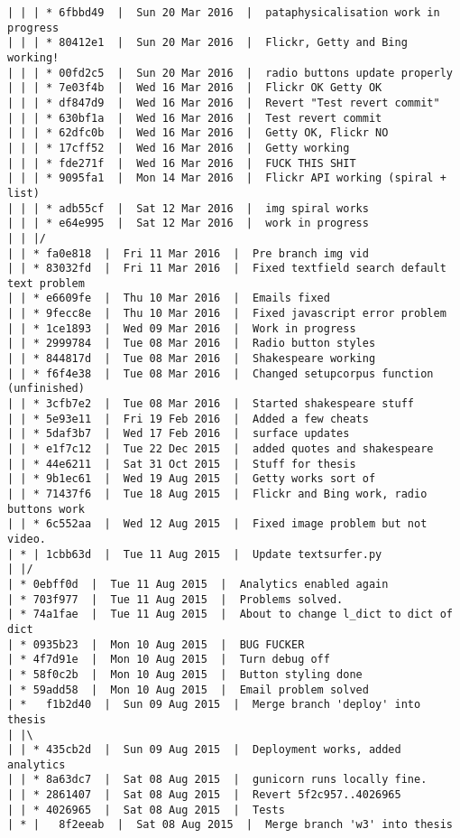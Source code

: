 \begin{verbatim}
| | | * 6fbbd49  |  Sun 20 Mar 2016  |  pataphysicalisation work in progress
| | | * 80412e1  |  Sun 20 Mar 2016  |  Flickr, Getty and Bing working!
| | | * 00fd2c5  |  Sun 20 Mar 2016  |  radio buttons update properly
| | | * 7e03f4b  |  Wed 16 Mar 2016  |  Flickr OK Getty OK
| | | * df847d9  |  Wed 16 Mar 2016  |  Revert "Test revert commit"
| | | * 630bf1a  |  Wed 16 Mar 2016  |  Test revert commit
| | | * 62dfc0b  |  Wed 16 Mar 2016  |  Getty OK, Flickr NO
| | | * 17cff52  |  Wed 16 Mar 2016  |  Getty working
| | | * fde271f  |  Wed 16 Mar 2016  |  FUCK THIS SHIT
| | | * 9095fa1  |  Mon 14 Mar 2016  |  Flickr API working (spiral + list)
| | | * adb55cf  |  Sat 12 Mar 2016  |  img spiral works
| | | * e64e995  |  Sat 12 Mar 2016  |  work in progress
| | |/  
| | * fa0e818  |  Fri 11 Mar 2016  |  Pre branch img vid
| | * 83032fd  |  Fri 11 Mar 2016  |  Fixed textfield search default text problem
| | * e6609fe  |  Thu 10 Mar 2016  |  Emails fixed
| | * 9fecc8e  |  Thu 10 Mar 2016  |  Fixed javascript error problem
| | * 1ce1893  |  Wed 09 Mar 2016  |  Work in progress
| | * 2999784  |  Tue 08 Mar 2016  |  Radio button styles
| | * 844817d  |  Tue 08 Mar 2016  |  Shakespeare working
| | * f6f4e38  |  Tue 08 Mar 2016  |  Changed setupcorpus function (unfinished)
| | * 3cfb7e2  |  Tue 08 Mar 2016  |  Started shakespeare stuff
| | * 5e93e11  |  Fri 19 Feb 2016  |  Added a few cheats
| | * 5daf3b7  |  Wed 17 Feb 2016  |  surface updates
| | * e1f7c12  |  Tue 22 Dec 2015  |  added quotes and shakespeare
| | * 44e6211  |  Sat 31 Oct 2015  |  Stuff for thesis
| | * 9b1ec61  |  Wed 19 Aug 2015  |  Getty works sort of
| | * 71437f6  |  Tue 18 Aug 2015  |  Flickr and Bing work, radio buttons work
| | * 6c552aa  |  Wed 12 Aug 2015  |  Fixed image problem but not video.
| * | 1cbb63d  |  Tue 11 Aug 2015  |  Update textsurfer.py
| |/  
| * 0ebff0d  |  Tue 11 Aug 2015  |  Analytics enabled again
| * 703f977  |  Tue 11 Aug 2015  |  Problems solved.
| * 74a1fae  |  Tue 11 Aug 2015  |  About to change l_dict to dict of dict
| * 0935b23  |  Mon 10 Aug 2015  |  BUG FUCKER
| * 4f7d91e  |  Mon 10 Aug 2015  |  Turn debug off
| * 58f0c2b  |  Mon 10 Aug 2015  |  Button styling done
| * 59add58  |  Mon 10 Aug 2015  |  Email problem solved
| *   f1b2d40  |  Sun 09 Aug 2015  |  Merge branch 'deploy' into thesis
| |\  
| | * 435cb2d  |  Sun 09 Aug 2015  |  Deployment works, added analytics
| | * 8a63dc7  |  Sat 08 Aug 2015  |  gunicorn runs locally fine.
| | * 2861407  |  Sat 08 Aug 2015  |  Revert 5f2c957..4026965
| | * 4026965  |  Sat 08 Aug 2015  |  Tests
| * |   8f2eeab  |  Sat 08 Aug 2015  |  Merge branch 'w3' into thesis

\end{verbatim}
